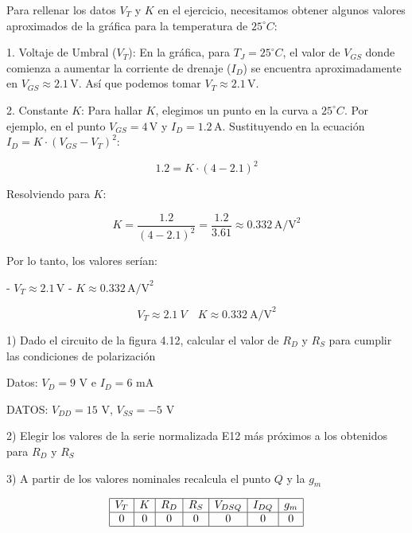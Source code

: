 \documentclass{article}
\begin{document}
Para rellenar los datos \( V_T \) y \( K \) en el ejercicio, necesitamos obtener algunos valores aproximados de la gráfica para la temperatura de \( 25^\circ C \):

1. Voltaje de Umbral (\( V_T \)):
   En la gráfica, para \( T_J = 25^\circ C \), el valor de \( V_{GS} \) donde comienza a aumentar la corriente de drenaje (\( I_D \)) se encuentra aproximadamente en \( V_{GS} \approx 2.1 \, \text{V} \). Así que podemos tomar \( V_T \approx 2.1 \, \text{V} \).

2. Constante \( K \):
   Para hallar \( K \), elegimos un punto en la curva a \( 25^\circ C \). Por ejemplo, en el punto \( V_{GS} = 4 \, \text{V} \) y \( I_D = 1.2 \, \text{A} \). Sustituyendo en la ecuación \( I_D = K \cdot (V_{GS} - V_T)^2 \):

   \[
   1.2 = K \cdot (4 - 2.1)^2
   \]

   Resolviendo para \( K \):

   \[
   K = \frac{1.2}{(4 - 2.1)^2} = \frac{1.2}{3.61} \approx 0.332 \, \text{A/V}^2
   \]

Por lo tanto, los valores serían:

- \( V_T \approx 2.1 \, \text{V} \)
- \( K \approx 0.332 \, \text{A/V}^2 \)







\[
	V_T \approx 2.1 \ V \quad K \approx 0.332 \ \text{A/V}^2
\]

1) Dado el circuito de la figura 4.12, calcular el valor de \( R_D \) y \( R_S \) para cumplir las condiciones 
de polarización

Datos: \( V_D = 9\text{ V} \) e \( I_D = 6\text{ mA} \)

DATOS: \( V_{DD} = 15\text{ V} \), \( V_{SS} = -5\text{ V} \)

2) Elegir los valores de la serie normalizada E12 más próximos a los obtenidos para \( R_D \) y \( R_S \)

3) A partir de los valores nominales recalcula el punto \( Q \) y la \( g_m \)

\[
\begin{array}{|c|c|c|c|c|c|c|}
\hline
V_T & K & R_D & R_S & V_{DSQ} & I_{DQ} & g_m \\
\hline
   0 & 0 & 0 & 0 & 0 & 0 & 0 \\
\hline
\end{array}
\]
\end{document}

